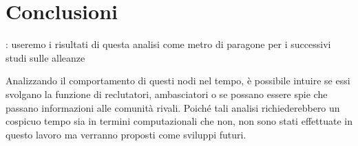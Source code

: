 \chapter{Conclusioni}
\blindtext

: useremo i risultati di questa analisi come metro di paragone per i successivi studi sulle alleanze

 Analizzando il comportamento di questi nodi nel tempo, è possibile intuire se essi svolgano la funzione di reclutatori, ambasciatori o se possano essere spie che passano informazioni alle comunità rivali. Poiché tali analisi richiederebbero un cospicuo tempo sia in termini computazionali che non, non sono stati effettuate in questo lavoro ma verranno proposti come sviluppi futuri.